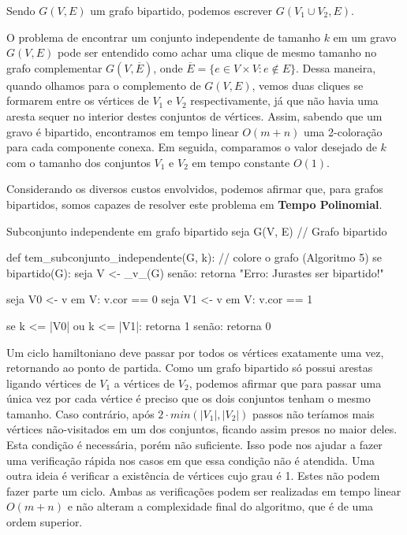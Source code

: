 \documentclass{homework}
\begin{document}
	\quest
	Sendo $G(V, E)$ um grafo bipartido, podemos escrever $G(V_{1} \cup V_{2}, E)$.\par
	\subsubquest
	O problema de encontrar um conjunto independente de tamanho $k$ em um gravo $G(V, E)$ pode ser entendido como achar uma clique de mesmo tamanho no grafo complementar $G(V, \overline{E})$, onde $\overline{E} = \{e \in V \times V: e \not\in E\}$. Dessa maneira, quando olhamos para o complemento de $G(V, E)$, vemos duas cliques se formarem entre os vértices de $V_{1}$ e $V_{2}$ respectivamente, já que não havia uma aresta sequer no interior destes conjuntos de vértices. Assim, sabendo que um gravo é bipartido, encontramos em tempo linear $O(m + n)$ uma 2-coloração para cada componente conexa. Em seguida, comparamos o valor desejado de $k$ com o tamanho dos conjuntos $V_{1}$ e $V_{2}$ em tempo constante $O(1)$.\par
	
	Considerando os diversos custos envolvidos, podemos afirmar que, para grafos bipartidos, somos capazes de resolver este problema em \textbf{Tempo Polinomial}.\par
	
	\begin{algor}{Subconjunto independente em grafo bipartido}
	seja G(V, E) // Grafo bipartido
	
	def tem_subconjunto_independente(G, k):
		// colore o grafo (Algoritmo 5)
		se bipartido(G):
			seja V <- _v_(G)
		senão:
			retorna "Erro: Jurastes ser bipartido!"
			
		seja V0 <- {v em V: v.cor == 0}
		seja V1 <- {v em V: v.cor == 1}
		
		se k <= |V0| ou k <= |V1|:
			retorna 1
		senão:
			retorna 0
	\end{algor}
	
	\newpage
	
	\subsubquest
	Um ciclo hamiltoniano deve passar por todos os vértices exatamente uma vez, retornando ao ponto de partida. Como um grafo bipartido só possui arestas ligando vértices de $V_{1}$ a vértices de $V_{2}$, podemos afirmar que para passar uma única vez por cada vértice é preciso que os dois conjuntos tenham o mesmo tamanho. Caso contrário, após $2 \cdot min(|V_{1}|, |V_{2}|)$ passos não teríamos mais vértices não-visitados em um dos conjuntos, ficando assim presos no maior deles. Esta condição é necessária, porém não suficiente. Isso pode nos ajudar a fazer uma verificação rápida nos casos em que essa condição não é atendida. Uma outra ideia é verificar a existência de vértices cujo grau é 1. Estes não podem fazer parte um ciclo. Ambas as verificações podem ser realizadas em tempo linear $O(m + n)$ e não alteram a complexidade final do algoritmo, que é de uma ordem superior.\par
	
\end{document}
